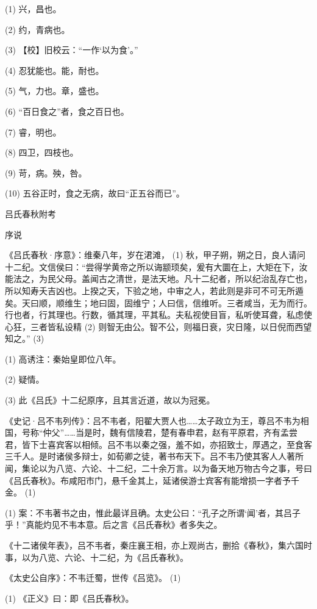 \documentclass[12pt,UTF8]{ctexbook}
\begin{document}
(1) 兴，昌也。

(2) 约，青病也。

(3) 【校】旧校云：“一作‘以为食’。”

(4) 忍犹能也。能，耐也。

(5) 气，力也。章，盛也。

(6) “百日食之”者，食之百日也。

(7) 睿，明也。

(8) 四卫，四枝也。

(9) 苛，病。殃，咎。

(10) 五谷正时，食之无病，故曰“正五谷而已”。





吕氏春秋附考



序说


《吕氏春秋·序意》：维秦八年，岁在涒滩， (1) 秋，甲子朔，朔之日，良人请问十二纪。文信侯曰：“尝得学黄帝之所以诲颛顼矣，爰有大圜在上，大矩在下，汝能法之，为民父母。盖闻古之清世，是法天地。凡十二纪者，所以纪治乱存亡也，所以知寿夭吉凶也。上揆之天，下验之地，中审之人，若此则是非可不可无所遁矣。天曰顺，顺维生；地曰固，固维宁；人曰信，信维听。三者咸当，无为而行。行也者，行其理也。行数，循其理，平其私。夫私视使目盲，私听使耳聋，私虑使心狂，三者皆私设精 (2) 则智无由公。智不公，则福日衰，灾日隆，以日倪而西望知之。” (3)

(1) 高诱注：秦始皇即位八年。

(2) 疑情。

(3) 此《吕氏》十二纪原序，且其言近道，故以为冠冕。

《史记·吕不韦列传》：吕不韦者，阳翟大贾人也……太子政立为王，尊吕不韦为相国，号称“仲父”……当是时，魏有信陵君，楚有春申君，赵有平原君，齐有孟尝君，皆下士喜宾客以相倾。吕不韦以秦之强，羞不如，亦招致士，厚遇之，至食客三千人。是时诸侯多辩士，如荀卿之徒，著书布天下。吕不韦乃使其客人人著所闻，集论以为八览、六论、十二纪，二十余万言。以为备天地万物古今之事，号曰《吕氏春秋》。布咸阳市门，悬千金其上，延诸侯游士宾客有能增损一字者予千金。 (1)

(1) 案：不韦著书之由，惟此最详且确。太史公曰：“孔子之所谓‘闻’者，其吕子乎！”真能灼见不韦本意。后之言《吕氏春秋》者多失之。

《十二诸侯年表》，吕不韦者，秦庄襄王相，亦上观尚古，删拾《春秋》，集六国时事，以为八览、六论、十二纪，为《吕氏春秋》。

《太史公自序》：不韦迁蜀，世传《吕览》。 (1)

(1) 《正义》曰：即《吕氏春秋》。
\end{document}
